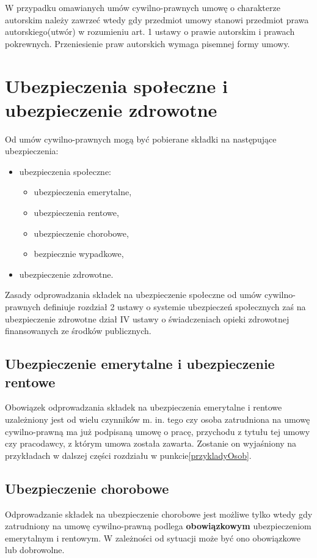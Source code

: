 W przypadku omawianych umów cywilno-prawnych umowę o charakterze autorskim należy zawrzeć wtedy gdy przedmiot umowy stanowi przedmiot prawa autorskiego(utwór) w rozumieniu art. 1 ustawy o prawie autorskim i prawach pokrewnych\cite{TODO}. Przeniesienie praw autorskich wymaga pisemnej formy umowy.

\section[Ubezpieczenia społeczne i ubezpieczenie zdrowotne][Ubezpieczenia społeczne i ubezpieczenie zdrowotne]{Ubezpieczenia społeczne i ubezpieczenie zdrowotne}
Od umów cywilno-prawnych mogą być pobierane składki na następujące ubezpieczenia:
\begin{itemize}
	\item ubezpieczenia społeczne:
	\begin{itemize}
		\item ubezpieczenia emerytalne,
		\item ubezpieczenia rentowe,
		\item ubezpieczenie chorobowe,
		\item bezpiecznie wypadkowe,
	\end{itemize}
	\item ubezpieczenie zdrowotne.
\end{itemize}
Zasady odprowadzania składek na ubezpieczenie społeczne od umów cywilno-prawnych definiuje rozdział 2 ustawy o systemie ubezpieczeń społecznych\cite{TODO} zaś na ubezpieczenie zdrowotne dział IV ustawy o świadczeniach opieki zdrowotnej finansowanych ze środków publicznych\cite{TODO}.

\subsection[Ubezpieczenie emerytalne i ubezpieczenie rentowe][Ubezpieczenie emerytalne i ubezpieczenie rentowe]{Ubezpieczenie emerytalne i ubezpieczenie rentowe}
Obowiązek odprowadzania składek na ubezpieczenia emerytalne i rentowe uzależniony jest od wielu czynników m. in. tego czy osoba zatrudniona na umowę cywilno-prawną ma już podpisaną umowę o pracę, przychodu z tytułu tej umowy czy pracodawcy, z którym umowa została zawarta. Zostanie on wyjaśniony na przykładach w dalszej części rozdziału w punkcie\ref{przykladyOsob}.

\subsection[Ubezpieczenie chorobowe][Ubezpieczenie chorobowe]{Ubezpieczenie chorobowe}
Odprowadzanie składek na ubezpieczenie chorobowe jest możliwe tylko wtedy gdy zatrudniony na umowę cywilno-prawną podlega \textbf{obowiązkowym} ubezpieczeniom emerytalnym i rentowym. W zależności od sytuacji może być ono obowiązkowe lub dobrowolne.

